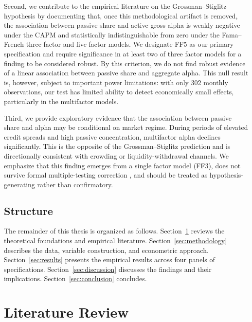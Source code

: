 \documentclass[11pt, a4paper]{article}
\begin{document}
Second, we contribute to the empirical literature on the Grossman--Stiglitz hypothesis by documenting that, once this methodological artifact is removed, the association between passive share and active gross alpha is weakly negative under the CAPM and statistically indistinguishable from zero under the Fama--French three-factor and five-factor models. We designate FF5 as our primary specification and require significance in at least two of three factor models for a finding to be considered robust. By this criterion, we do not find robust evidence of a linear association between passive share and aggregate alpha. This null result is, however, subject to important power limitations: with only 302 monthly observations, our test has limited ability to detect economically small effects, particularly in the multifactor models.

Third, we provide exploratory evidence that the association between passive share and alpha may be conditional on market regime. During periods of elevated credit spreads and high passive concentration, multifactor alpha declines significantly. This is the opposite of the Grossman--Stiglitz prediction and is directionally consistent with crowding or liquidity-withdrawal channels. We emphasize that this finding emerges from a single factor model (FF3), does not survive formal multiple-testing correction \parencite{benjamini1995}, and should be treated as hypothesis-generating rather than confirmatory.

\subsection{Structure}

The remainder of this thesis is organized as follows. Section~\ref{sec:literature} reviews the theoretical foundations and empirical literature. Section~\ref{sec:methodology} describes the data, variable construction, and econometric approach. Section~\ref{sec:results} presents the empirical results across four panels of specifications. Section~\ref{sec:discussion} discusses the findings and their implications. Section~\ref{sec:conclusion} concludes.


\section{Literature Review}
\label{sec:literature}
\end{document}
